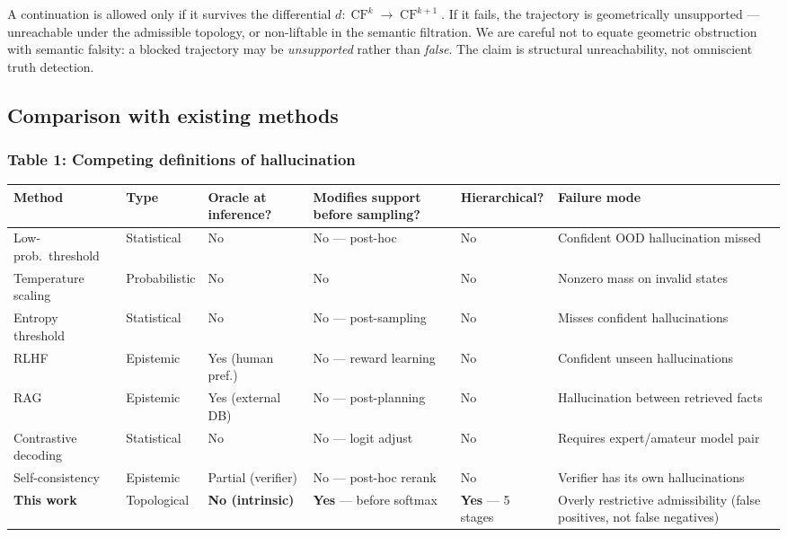 \documentclass[11pt,a4paper]{article}
\DeclareMathOperator{\CF}{CF}
\begin{document}
\noindent
A continuation is allowed only if it survives the differential
$d: \CF^k \to \CF^{k+1}$.
If it fails, the trajectory is geometrically unsupported ---
unreachable under the admissible topology, or non-liftable in the
semantic filtration.
We are careful not to equate geometric obstruction with semantic
falsity: a blocked trajectory may be \emph{unsupported} rather than
\emph{false}. The claim is structural unreachability, not
omniscient truth detection.

\subsection{Comparison with existing methods}

\subsubsection*{Table 1: Competing definitions of hallucination}

\begin{center}
\renewcommand{\arraystretch}{1.3}\small
\begin{tabular}{p{2.6cm}p{1.6cm}p{1.9cm}p{2.0cm}p{1.4cm}p{2.8cm}}
\toprule
\textbf{Method} &
\textbf{Type} &
\textbf{Oracle at inference?} &
\textbf{Modifies support before sampling?} &
\textbf{Hierarchical?} &
\textbf{Failure mode} \\
\midrule
Low-prob.\ threshold & Statistical & No & No — post-hoc & No &
  Confident OOD hallucination missed \\
Temperature scaling & Probabilistic & No & No & No &
  Nonzero mass on invalid states \\
Entropy threshold & Statistical & No & No — post-sampling & No &
  Misses confident hallucinations \\
RLHF & Epistemic & Yes (human pref.) & No — reward learning & No &
  Confident unseen hallucinations \\
RAG & Epistemic & Yes (external DB) & No — post-planning & No &
  Hallucination between retrieved facts \\
Contrastive decoding & Statistical & No & No — logit adjust & No &
  Requires expert/amateur model pair \\
Self-consistency & Epistemic & Partial (verifier) & No — post-hoc rerank & No &
  Verifier has its own hallucinations \\
\midrule
\textbf{This work} & Topological & \textbf{No (intrinsic)} &
  \textbf{Yes} --- before softmax &
  \textbf{Yes} --- 5 stages &
  Overly restrictive admissibility (false positives, not false negatives) \\
\bottomrule
\end{tabular}
\end{center}
\end{document}
